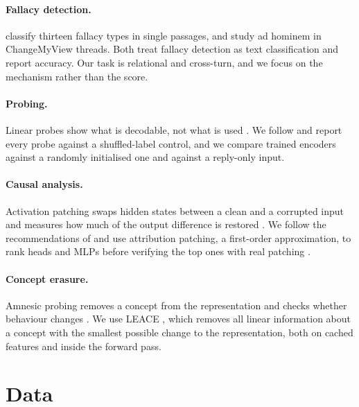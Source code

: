 \documentclass[11pt]{article}
\begin{document}
\paragraph{Fallacy detection.} \citet{jin2022logical} classify thirteen fallacy types in single passages, and \citet{habernal2018adhominem} study ad hominem in ChangeMyView threads. Both treat fallacy detection as text classification and report accuracy. Our task is relational and cross-turn, and we focus on the mechanism rather than the score.

\paragraph{Probing.} Linear probes show what is decodable, not what is used \citep{belinkov2022probing}. We follow \citet{hewitt2019control} and report every probe against a shuffled-label control, and we compare trained encoders against a randomly initialised one and against a reply-only input.

\paragraph{Causal analysis.} Activation patching swaps hidden states between a clean and a corrupted input and measures how much of the output difference is restored \citep{vig2020causal,meng2022locating,wang2023ioi}. We follow the recommendations of \citet{zhang2024best} and use attribution patching, a first-order approximation, to rank heads and MLPs before verifying the top ones with real patching \citep{syed2024attribution,kramar2024atp}.

\paragraph{Concept erasure.} Amnesic probing removes a concept from the representation and checks whether behaviour changes \citep{elazar2021amnesic,ravfogel2020inlp}. We use LEACE \citep{belrose2023leace}, which removes all linear information about a concept with the smallest possible change to the representation, both on cached features and inside the forward pass.

\section{Data}
\end{document}
